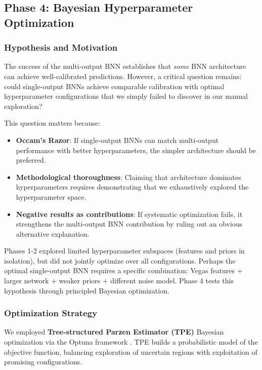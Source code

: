 \subsection{Phase 4: Bayesian Hyperparameter Optimization}
\label{subsec:phase4_optimization}

\subsubsection{Hypothesis and Motivation}

The success of the multi-output BNN establishes that \textit{some} BNN architecture can achieve well-calibrated predictions. However, a critical question remains: could single-output BNNs achieve comparable calibration with optimal hyperparameter configurations that we simply failed to discover in our manual exploration?

This question matters because:

\begin{itemize}
    \item \textbf{Occam's Razor}: If single-output BNNs can match multi-output performance with better hyperparameters, the simpler architecture should be preferred.
    \item \textbf{Methodological thoroughness}: Claiming that architecture dominates hyperparameters requires demonstrating that we exhaustively explored the hyperparameter space.
    \item \textbf{Negative results as contributions}: If systematic optimization fails, it strengthens the multi-output BNN contribution by ruling out an obvious alternative explanation.
\end{itemize}

Phases 1-2 explored limited hyperparameter subspaces (features and priors in isolation), but did not jointly optimize over all configurations. Perhaps the optimal single-output BNN requires a specific combination: Vegas features + larger network + weaker priors + different noise model. Phase 4 tests this hypothesis through principled Bayesian optimization.

\subsubsection{Optimization Strategy}

We employed \textbf{Tree-structured Parzen Estimator (TPE)} Bayesian optimization via the Optuna framework \citep{akiba2019optuna}. TPE builds a probabilistic model of the objective function, balancing exploration of uncertain regions with exploitation of promising configurations.

